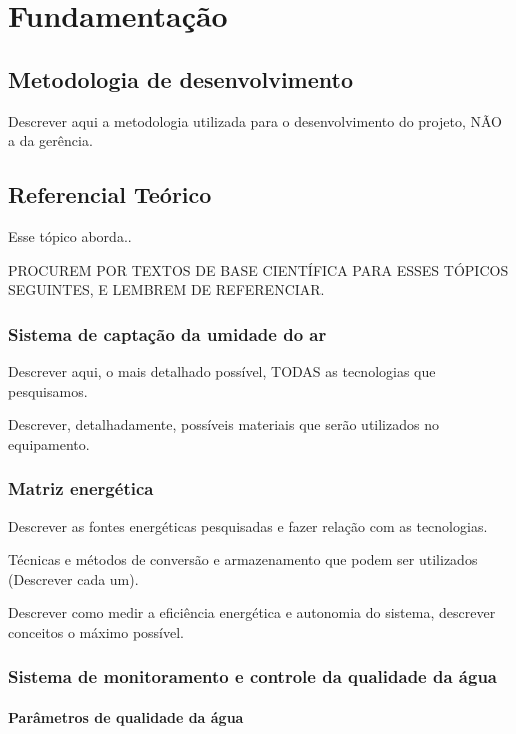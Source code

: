 \chapter[Fundamentação]{Fundamentação}

  \section{Metodologia de desenvolvimento}
  
  Descrever aqui a metodologia utilizada para o desenvolvimento do projeto, NÃO a da gerência.
  
  \section{Referencial Teórico}
  
    Esse tópico aborda..
    
    PROCUREM POR TEXTOS DE BASE CIENTÍFICA PARA ESSES TÓPICOS SEGUINTES, E LEMBREM DE REFERENCIAR.
    
  \subsection{Sistema de captação da umidade do ar}
  
  Descrever aqui, o mais detalhado possível, TODAS as tecnologias que pesquisamos.
  
  Descrever, detalhadamente, possíveis materiais que serão utilizados no equipamento.
  
  \subsection{Matriz energética}
  
  Descrever as fontes energéticas pesquisadas e fazer relação com as tecnologias.
  
  Técnicas e métodos de conversão e armazenamento que podem ser utilizados (Descrever cada um).
  
  Descrever como medir a eficiência energética e autonomia do sistema, descrever conceitos o máximo possível.
  
  \subsection{Sistema de monitoramento e controle da qualidade da água}
    
    \subsubsection{Parâmetros de qualidade da água}
    
